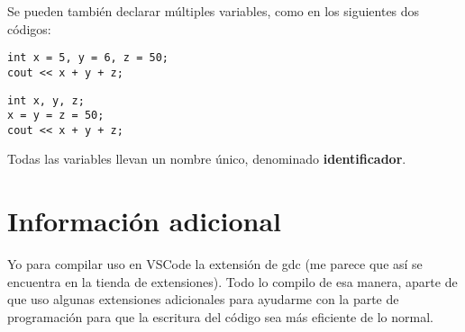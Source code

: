 \documentclass[12pt]{report}
\newcounter{it}
\theoremstyle{largebreak}
\begin{document}
    Se pueden también declarar múltiples variables, como en los siguientes dos códigos:

    \begin{lstlisting}
int x = 5, y = 6, z = 50;
cout << x + y + z;
    \end{lstlisting}

    \begin{lstlisting}
int x, y, z;
x = y = z = 50;
cout << x + y + z;
    \end{lstlisting}

    Todas las variables llevan un nombre único, denominado \textbf{identificador}.

    \chapter*{Información adicional}

    Yo para compilar uso en VSCode la extensión de gdc (me parece que así se encuentra en la tienda de extensiones). Todo lo compilo de esa manera, aparte de que uso algunas extensiones adicionales para ayudarme con la parte de programación para que la escritura del código sea más eficiente de lo normal.
\end{document}
